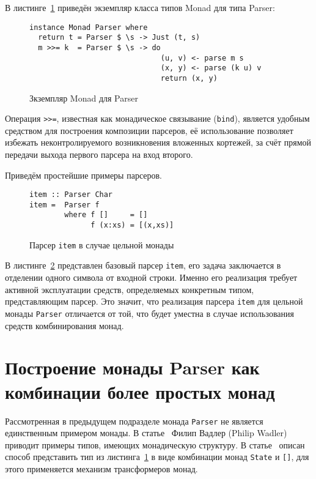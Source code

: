 В листинге~\ref{listing:MonadParser} приведён экземпляр класса типов Monad для 
типа Parser:

\begin{figure}[t]
  \begin{lstlisting}
instance Monad Parser where
  return t = Parser $ \s -> Just (t, s)
  m >>= k  = Parser $ \s -> do
                              (u, v) <- parse m s
                              (x, y) <- parse (k u) v
                              return (x, y)
  \end{lstlisting}
  \caption{Зкземпляр Monad для Parser}
  \label{listing:MonadParser}
\end{figure}

Операция \lstinline{>>=}, известная как монадическое связывание 
(\lstinline{bind}), является удобным средством для построения композиции 
парсеров, её использование позволяет избежать неконтролируемого возникновения
вложенных кортежей, за счёт прямой передачи выхода первого парсера на вход
второго.

Приведём простейшие примеры парсеров.

\begin{figure}[h]
  \begin{lstlisting}
item :: Parser Char
item =  Parser f
        where f []     = []
              f (x:xs) = [(x,xs)]
  \end{lstlisting}
  \caption{Парсер \lstinline{item} в случае цельной монады}
  \label{listing:ParserItem}
\end{figure}

В листинге~\ref{listing:ParserItem} представлен базовый парсер \lstinline{item},
его задача заключается в отделении одного символа от входной строки. Именно его
реализация требует активной эксплуатации средств, определяемых конкретным типом,
представляющим парсер. Это значит, что реализация парсера \lstinline{item} для
цельной монады \lstinline{Parser} отличается от той, что будет уместна в случае
использования средств комбинирования монад.

\section{Построение монады Parser как комбинации более простых монад}

Рассмотренная в предыдущем подразделе монада \lstinline{Parser} не является
единственным примером монады. В статье~\cite{wadlerMonads} Филип Вадлер
(Philip Wadler) приводит примеры типов, имеющих монадическую структуру.
В статье~\cite{monParsing} описан способ представить тип из
листинга~\ref{listing:MonadParser} в виде комбинации монад \lstinline{State}
и \lstinline{[]}, для этого применяется механизм трансформеров монад.

